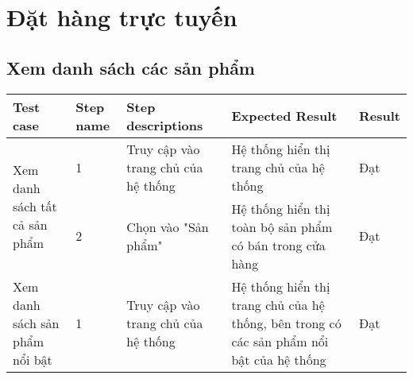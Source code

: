 \section{Đặt hàng trực tuyến}

\subsection{Xem danh sách các sản phẩm}
{
    \setlength\extrarowheight{6pt}
    \begin{longtable}{| p{2.5cm}| p{1cm}| p{5.5cm}| p{4.5cm} | p{1.5cm} |}
        \hline
        \textbf{Test case} & \textbf{Step name} & \textbf{Step descriptions} & \textbf{Expected Result} & \textbf{Result} \\
        \hline
        \multirow[t]{2}{2.5cm}{Xem danh sách tất cả sản phẩm} & 
        1 & 
        Truy cập vào trang chủ của hệ thống & 
        Hệ thống hiển thị trang chủ của hệ thống & 
        Đạt \\
        \cline{2-5}
         & 2 & 
         Chọn vào "Sản phẩm" & 
         Hệ thống hiển thị toàn bộ sản phẩm có bán trong cửa hàng & 
         Đạt \\
         \hline
        \multirow[t]{2}{2.5cm}{Xem danh sách sản phẩm nổi bật} & 
        1 & 
        Truy cập vào trang chủ của hệ thống & 
        Hệ thống hiển thị trang chủ của hệ thống, bên trong có các sản phẩm nổi bật của hệ thống & 
        Đạt \\
         \hline
    \end{longtable}
}

